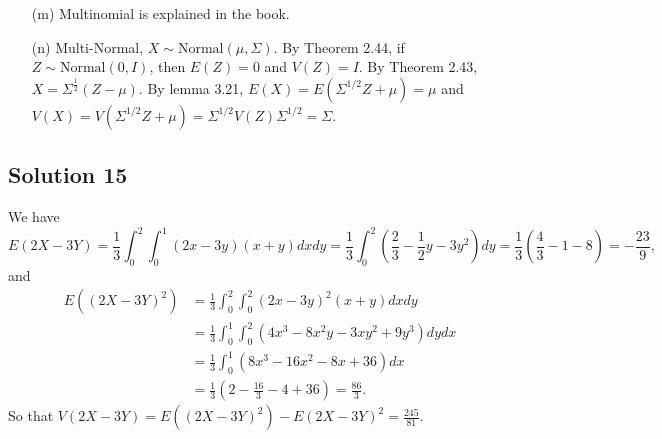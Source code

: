\begin{itemize}
\item[(m)] Multinomial is explained in the book.

\item[(n)] Multi-Normal, $X \sim \mathrm{Normal}(\mu, \Sigma)$.
By Theorem 2.44, if $Z \sim \mathrm{Normal}(0, I)$, then $E(Z) = 0$ and $V(Z) = I$.
By Theorem 2.43, $X = \Sigma^{\frac{1}{2}} (Z - \mu)$.
By lemma 3.21, $E(X) = E(\Sigma^{1/2}Z + \mu) = \mu$ and $V(X) = V(\Sigma^{1/2}Z + \mu) = \Sigma^{1/2} V(Z) \Sigma^{1/2} = \Sigma$.

\end{itemize}


\subsection*{Solution 15}

We have
\begin{equation*}
E(2X - 3Y) = \frac{1}{3} \int_0^2 \int_0^1 (2x - 3y)(x + y) dx dy
    = \frac{1}{3} \int_0^2 (\frac{2}{3} - \frac{1}{2}y - 3y^2) dy
    = \frac{1}{3} (\frac{4}{3} - 1 - 8)
    = - \frac{23}{9},
\end{equation*}
and
\begin{equation*}
\begin{split}
E((2X - 3Y)^2) &= \frac{1}{3} \int_0^2 \int_0^2 (2x - 3y)^2 (x + y) dx dy \\
    &= \frac{1}{3} \int_0^1 \int_0^2 (4x^3 - 8x^2y - 3xy^2 + 9y^3) dy dx \\
    &= \frac{1}{3} \int_0^1 (8x^3 - 16x^2 - 8x + 36) dx \\
    &= \frac{1}{3} (2 - \frac{16}{3} - 4 + 36)
    = \frac{86}{3}.
\end{split}
\end{equation*}
So that $V(2X - 3Y) = E((2X - 3Y)^2) - E(2X - 3Y)^2 = \frac{245}{81}$.
